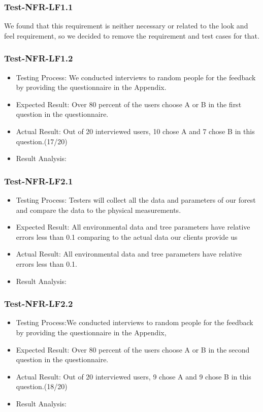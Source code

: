 \documentclass[12pt, titlepage]{article}
\begin{document}
		\subsubsection{Test-NFR-LF1.1}
We found that this requirement is neither necessary or related to the look and feel requirement, so we decided to remove the requirement and test cases for that.
            \subsubsection{Test-NFR-LF1.2}
\begin{itemize}
    \item Testing Process: We conducted interviews to random people for the feedback by providing the questionnaire in the Appendix.
    \item Expected Result: Over 80 percent of the users choose A or B in the first question in the questionnaire.
    \item Actual Result: Out of 20 interviewed users, 10 chose A and 7 chose B in this question.(17/20)
    \item Result Analysis: \pass  
\end{itemize}
            \subsubsection{Test-NFR-LF2.1}
\begin{itemize}
    \item Testing Process: Testers will collect all the data and parameters of our forest and compare the data to the physical measurements.
    \item Expected Result: All environmental data and tree parameters have relative errors less than 0.1 comparing to the actual data our clients provide us
    \item Actual Result: All environmental data and tree parameters have relative errors less than 0.1.
    \item Result Analysis: \pass
\end{itemize}
            \subsubsection{Test-NFR-LF2.2}
\begin{itemize}
    \item Testing Process:We conducted interviews to random people for the feedback by providing the questionnaire in the Appendix,
    \item Expected Result: Over 80 percent of the users choose A or B in the second question in the questionnaire.
    \item Actual Result: Out of 20 interviewed users, 9 chose A and 9 chose B in this question.(18/20)
    \item Result Analysis: \pass
\end{itemize}
\end{document}
